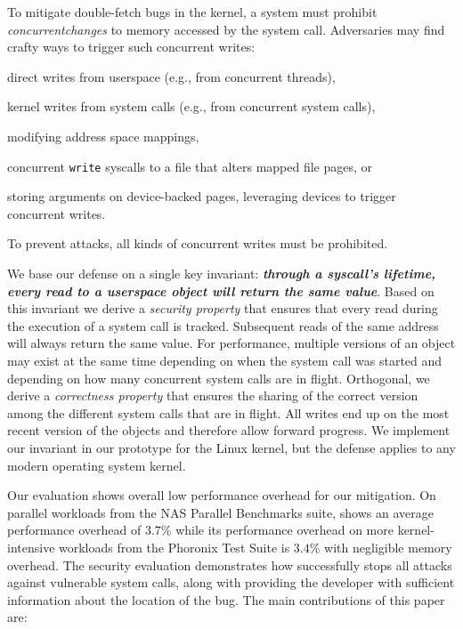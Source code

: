 \documentclass[letterpaper,twocolumn,10pt]{article}
\begin{document}
To mitigate double-fetch bugs in the kernel, a system must prohibit
\emph{concurrent\footnotemark changes} to memory accessed by the system call. Adversaries may
find crafty ways to trigger such concurrent writes:
\begin{inparaenum}
\item  direct writes from userspace (e.g., from concurrent threads),
\item  kernel writes from system calls (e.g., from concurrent system calls),
\item  modifying address space mappings,
\item  concurrent \texttt{write} syscalls to a file that alters mapped
file pages, or
\item  storing arguments on device-backed pages, leveraging devices to trigger
concurrent writes.
\end{inparaenum}
To prevent attacks, all kinds of concurrent writes must be prohibited.

We base our defense on a single key invariant: 
\textbf{\emph{through a syscall's lifetime, every read to a userspace object 
will return the same value}}. Based on this invariant we derive a \emph{security
property} that ensures that every read during the execution of a system call is
tracked. Subsequent reads of the same address will always return the same value.
For performance, multiple versions of an object may exist at the same time
depending on when the system call was started and depending on how many
concurrent system calls are in flight. Orthogonal, we derive a \emph{correctness
property} that ensures the sharing of the correct version among the different
system calls that are in flight. All writes end up on the most recent version of
the objects and therefore allow forward progress.
We implement our invariant in our \midas prototype for the Linux kernel, but
the defense applies to any modern operating system kernel.

Our evaluation shows overall low performance overhead for our mitigation.
On parallel workloads from the NAS Parallel Benchmarks suite, \midas shows 
an average performance overhead of $3.7\%$ while its performance overhead on
more kernel-intensive workloads from the Phoronix Test Suite is $3.4\%$ with 
negligible memory overhead.
The security evaluation demonstrates how \midas successfully stops all attacks
against vulnerable system calls, along with providing the developer with
sufficient information about the location of the bug.
%
The main contributions of this paper are:
\end{document}

